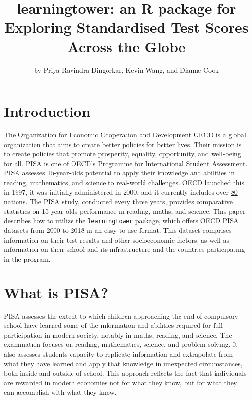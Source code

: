 \title{learningtower: an R package for Exploring Standardised Test
Scores Across the Globe}
\author{by Priya Ravindra Dingorkar, Kevin Wang, and Dianne Cook}

\maketitle


\hypertarget{introduction}{%
\section{Introduction}\label{introduction}}

The Organization for Economic Cooperation and Development
\href{OECD\%20-\%20https://www.oecd.org/about/}{OECD} is a global
organization that aims to create better policies for better lives. Their
mission is to create policies that promote prosperity, equality,
opportunity, and well-being for all.
\href{PISA\%20-\%20https://www.oecd.org/pisa/}{PISA} is one of OECD's
Programme for International Student Assessment. PISA assesses
15-year-olds potential to apply their knowledge and abilities in
reading, mathematics, and science to real-world challenges. OECD
launched this in 1997, it was initially administered in 2000, and it
currently includes over
\href{https://www.oecd.org/pisa/aboutpisa/pisa-participants.htm}{80
nations}. The PISA study, conducted every three years, provides
comparative statistics on 15-year-olds performance in reading, maths,
and science. This paper describes how to utilize the
\texttt{learningtower} package, which offers OECD PISA datasets from
2000 to 2018 in an easy-to-use format. This dataset comprises
information on their test results and other socioeconomic factors, as
well as information on their school and its infrastructure and the
countries participating in the program.

\hypertarget{what-is-pisa}{%
\section{What is PISA?}\label{what-is-pisa}}

PISA assesses the extent to which children approaching the end of
compulsory school have learned some of the information and abilities
required for full participation in modern society, notably in maths,
reading, and science. The examination focuses on reading, mathematics,
science, and problem solving. It also assesses students capacity to
replicate information and extrapolate from what they have learned and
apply that knowledge in unexpected circumstances, both inside and
outside of school. This approach reflects the fact that individuals are
rewarded in modern economies not for what they know, but for what they
can accomplish with what they know.

